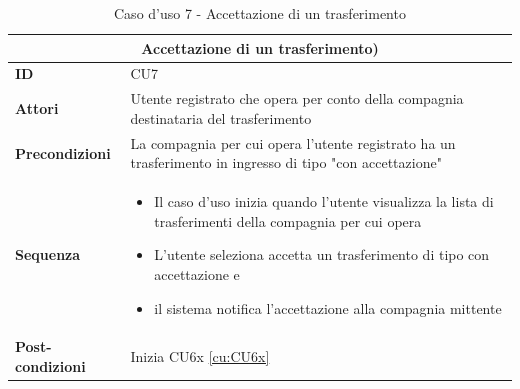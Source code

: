 \documentclass[a4paper,11pt]{article}
\begin{document}
\begin{table}[H]
  \centering
  \begin{tabular}{|m{2cm}|m{10.5cm}|}
    \hline
    \multicolumn{2}{|c|}{\textbf{Accettazione di un trasferimento)}}           \\ \hline
    \multicolumn{1}{|l|}{\textbf{ID}}              & CU7                       \\ \hline
    \multicolumn{1}{|l|}{\textbf{Attori}}          &

    Utente registrato che opera per conto della compagnia destinataria del trasferimento

    \\ \hline
    \multicolumn{1}{|l|}{\textbf{Precondizioni}}   &

    La compagnia per cui opera l'utente registrato ha un trasferimento in ingresso di tipo "con accettazione"

    \\ \hline
    \multicolumn{1}{|l|}{\textbf{Sequenza}}        &

    \begin{itemize}
      \item Il caso d'uso inizia quando l'utente visualizza la lista di trasferimenti della compagnia per cui opera
      \item L'utente seleziona accetta un trasferimento di tipo con accettazione e
      \item il sistema notifica l'accettazione alla compagnia mittente
    \end{itemize}

    \\ \hline
    \multicolumn{1}{|l|}{\textbf{Post-condizioni}} & Inizia CU6x \ref{cu:CU6x} \\ \hline
  \end{tabular}
  \caption{Caso d'uso 7 - Accettazione di un trasferimento}
  \label{cu:CU7}
\end{table}
\end{document}
